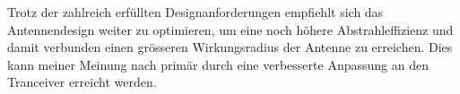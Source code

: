 Trotz der zahlreich erfüllten Designanforderungen empfiehlt sich das Antennendesign weiter zu optimieren, um eine noch höhere Abstrahleffizienz und damit verbunden einen grösseren Wirkungsradius der Antenne zu erreichen. Dies kann meiner Meinung nach primär durch eine verbesserte Anpassung an den Tranceiver erreicht werden. 

 




 
